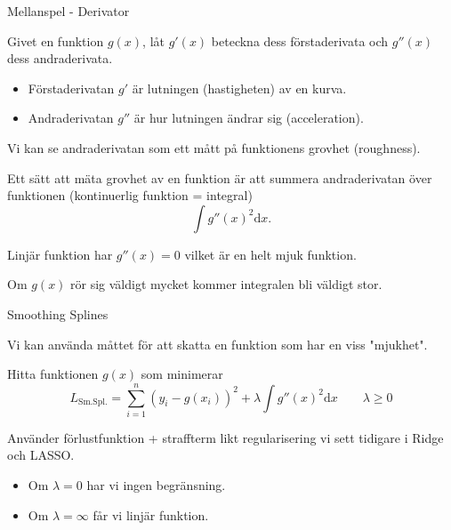 \documentclass[10pt,english]{beamer}
\begin{document}
\begin{frame}{Mellanspel - Derivator}

    Givet en funktion $g(x)$, låt $g'(x)$ beteckna dess förstaderivata och $g''(x)$ dess andraderivata.

    \begin{itemize}
        \item Förstaderivatan $g'$ är lutningen (hastigheten) av en kurva.
        \item Andraderivatan $g''$ är hur lutningen ändrar sig (acceleration).
    \end{itemize}

    Vi kan se andraderivatan som ett mått på funktionens grovhet (roughness).

    Ett sätt att mäta grovhet av en funktion är att summera andraderivatan över funktionen (kontinuerlig funktion = integral)
    \begin{equation*}
        \int g''(x)^2 \mathrm{d}x.
    \end{equation*}

    Linjär funktion har $g''(x) = 0$ vilket är en helt mjuk funktion.

    Om $g(x)$ rör sig väldigt mycket kommer integralen bli väldigt stor.
\end{frame}

\begin{frame}{Smoothing Splines}

    Vi kan använda måttet för att skatta en funktion som har en viss "mjukhet".

    \begin{greenbox}
        Hitta funktionen $g(x)$ som minimerar
        \begin{equation*}
            L_{\text{Sm.Spl.}} = \sum_{i=1}^{n}(y_i - g(x_i))^2 + \lambda \int g''(x)^2 \mathrm{d}x \qquad \lambda \ge 0
        \end{equation*}
    \end{greenbox}
    
    Använder förlustfunktion + straffterm likt regularisering vi sett tidigare i Ridge och LASSO.

    \begin{itemize}
        \item Om $\lambda = 0$ har vi ingen begränsning.
        \item Om $\lambda = \infty$ får vi linjär funktion.
    \end{itemize}
\end{frame}
\end{document}
